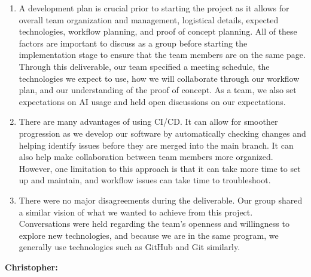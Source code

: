 \documentclass{article}
\begin{document}
\begin{enumerate}
	\item A development plan is crucial prior to starting the project as it allows for overall team 
	organization and management, logistical details, expected technologies, workflow planning, and 
	proof of concept planning. All of these factors are important to discuss as a group before starting 
	the implementation stage to ensure that the team members are on the same page. Through this deliverable, 
	our team specified a meeting schedule, the technologies we expect to use, how we will collaborate through 
	our workflow plan, and our understanding of the proof of concept. As a team, we also set expectations on 
	AI usage and held open discussions on our expectations.
	\item There are many advantages of using CI/CD. It can allow for smoother progression as we develop our software 
	by automatically checking changes and helping identify issues before they are merged into the main branch. It can 
	also help make collaboration between team members more organized. However, one limitation to this approach is that 
	it can take more time to set up and maintain, and workflow issues can take time to troubleshoot.
	\item There were no major disagreements during the deliverable. Our group shared a similar vision of what we wanted to 
	achieve from this project. Conversations were held regarding the team's openness and willingness to explore new technologies, 
	and because we are in the same program, we generally use technologies such as GitHub and Git similarly.
\end{enumerate}

\noindent \textbf{Christopher:}
	
\end{document}
